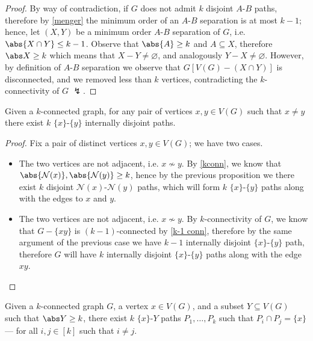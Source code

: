 \documentclass[a4paper, 12pt]{report}
\begin{document}
    \begin{proof}
        By way of contradiction, if $G$ does not admit $k$ disjoint $A$-$B$ paths, therefore by \cref{menger} the minimum order of an $A$-$B$ separation is at most $k - 1$; hence, let $(X, Y)$ be a minimum order $A$-$B$ separation of $G$, i.e. $\abs{X \cap Y} \le k - 1$. Observe that $\abs{A} \ge k$ and $A \subseteq X$, therefore $\abs X \ge k$ which means that $X - Y \neq \varnothing$, and analogously $Y - X \neq \varnothing$. However, by definition of $A$-$B$ separation we observe that $G[V(G)-(X \cap Y)]$ is disconnected, and we removed less than $k$ vertices, contradicting the $k$-connectivity of $G$ $\lightning$.
    \end{proof}

    \begin{framedprop}[label={intern disj menger}]{}
        Given a $k$-connected graph, for any pair of vertices $x, y \in V(G)$ such that $x \neq y$ there exist $k$ $\{x\}$-$\{y\}$ internally disjoint paths.
    \end{framedprop}

    \begin{proof}
        Fix a pair of distinct vertices $x, y \in V(G)$; we have two cases.

        \begin{itemize}
            \item The two vertices are not adjacent, i.e. $x \nsim y$. By \cref{kconn}, we know that $\abs{\mathcal N(x)} , \abs{\mathcal N(y)} \ge k$, hence by the previous proposition we there exist $k$ disjoint $\mathcal N(x)$-$\mathcal N(y)$ paths, which will form $k$  $\{x\}$-$\{y\}$ paths along with the edges to $x$ and $y$.
            \item The two vertices are not adjacent, i.e. $x \nsim y$. By $k$-connectivity of $G$, we know that $G - \{xy\}$ is $(k-1)$-connected by \cref{k-1 conn}, therefore by the same argument of the previous case we have $k - 1$ internally disjoint $\{x\}$-$\{y\}$ path, therefore $G$ will have $k$ internally disjoint $\{x\}$-$\{y\}$ paths along with the edge $xy$.
        \end{itemize}
    \end{proof}

    \begin{framedcor}[label={menger cor}]{}
        Given a $k$-connected graph $G$, a vertex $x \in V(G)$, and a subset $Y \subseteq V(G)$ such that $\abs Y \ge k$, there exist $k$ $\{x\}$-$Y$ paths $P_1, \ldots, P_k$ such that $P_i \cap P_j = \{x\}$ --- for all $i, j \in [k]$ such that $i \neq j$.
    \end{framedcor}
\end{document}
